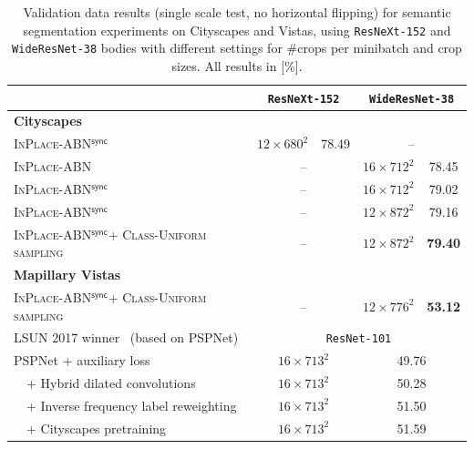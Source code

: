 \documentclass[10pt,twocolumn,letterpaper]{article}
\newcommand{\bnInplace}{\textsc{InPlace-ABN}\xspace}
\newcommand{\bnInplaceSync}{\textsc{InPlace-ABN$^{\mathsf{sync}}$}\xspace}
\begin{document}
\begin{table}[t]
\centering
\small
\begin{tabular}{lcccc}
  \toprule 
      & \multicolumn{2}{c}{\texttt{ResNeXt-152}} & \multicolumn{2}{c}{\texttt{WideResNet-38}} \\
	\midrule
    \textbf{Cityscapes} & & & & \\
    \bnInplaceSync & $12\times 680^2$  & 78.49 & \multicolumn{2}{c}{--}\\
    \bnInplace & \multicolumn{2}{c}{--} & $16\times 712^2$ & 78.45 \\
    \bnInplaceSync & \multicolumn{2}{c}{--} & $16\times 712^2$ & 79.02 \\
    \bnInplaceSync & \multicolumn{2}{c}{--} & $12\times 872^2$ & 79.16 \\ %
    \bnInplaceSync + \textsc{Class-Uniform sampling} & \multicolumn{2}{c}{--} & $12\times 872^2$ & \textbf{79.40} \\
    \midrule
    \rowcolor{gray!25} \textbf{Mapillary Vistas} & & & & \\
    \rowcolor{gray!25} \bnInplaceSync + \textsc{Class-Uniform sampling} & \multicolumn{2}{c}{--} & $12\times 776^2$ & \textbf{53.12} \\
    \rowcolor{gray!25}\midrule        
    \rowcolor{gray!25}LSUN 2017 winner~\cite{LSUNSeg17} (based on PSPNet) & \multicolumn{4}{c}{\texttt{ResNet-101}} \\
    \rowcolor{gray!25}PSPNet + auxiliary loss & \multicolumn{2}{c}{$16\times 713^2$} & \multicolumn{2}{c}{49.76}\\
    \rowcolor{gray!25}$\quad$+ Hybrid dilated convolutions~\cite{Wang2017} & \multicolumn{2}{c}{$16\times 713^2$} & \multicolumn{2}{c}{50.28}\\
    \rowcolor{gray!25}$\quad$+ Inverse frequency label reweighting & \multicolumn{2}{c}{$16\times 713^2$} & \multicolumn{2}{c}{51.50}\\
    \rowcolor{gray!25}$\quad$+ Cityscapes pretraining & \multicolumn{2}{c}{$16\times 713^2$} & \multicolumn{2}{c}{51.59}\\


  \bottomrule
\end{tabular}
\vspace{5pt}
   \caption{Validation data results (single scale test, no horizontal flipping) for semantic segmentation experiments on Cityscapes and Vistas, using \texttt{ResNeXt-152} and \texttt{WideResNet-38} bodies with different settings for \#crops per minibatch and crop sizes. All results in [\%].}
\label{tab:moreresults}
\end{table}
\end{document}
